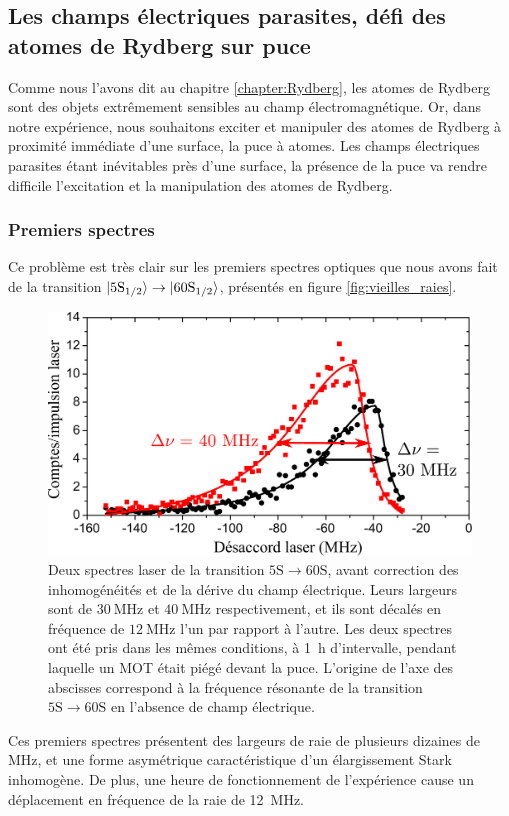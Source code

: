 %


		
	\subsection{Les champs électriques parasites, défi des atomes de Rydberg sur puce}\label{subsec:flashRb}
\noindent Comme nous l'avons dit au chapitre \ref{chapter:Rydberg}, les atomes de Rydberg sont des objets extrêmement sensibles au champ électromagnétique.
Or, dans notre expérience, nous souhaitons exciter et manipuler des atomes de Rydberg à proximité immédiate d'une surface, la puce à atomes.
Les champs électriques parasites étant inévitables près d'une surface, la présence de la puce va rendre difficile l'excitation et la manipulation des atomes de Rydberg.

\subsubsection*{Premiers spectres}
\noindent Ce problème est très clair sur les premiers spectres optiques que nous avons fait de la transition $\ket{\mathrm{5S_{1/2}}} \rightarrow \ket{\mathrm{60S_{1/2}}}$, présentés en figure \eqref{fig:vieilles_raies}.
%
\begin{figure}[!h]
\centering
\includegraphics[width=.8\linewidth]{figures/setup/rydberg/vieilles_raies}
\caption[Spectres d'excitation laser 5S-60S avant le dépôt de rubidium sur la puce]{
Deux spectres laser de la transition $5\mathrm{S}\rightarrow60\mathrm{S}$, avant correction des inhomogénéités et de la dérive du champ électrique.
Leurs largeurs sont de $\SI{30}{\MHz}$ et $\SI{40}{\MHz}$ respectivement, et ils sont décalés en fréquence de $\SI{12}{\MHz}$ l'un par rapport à l'autre.
Les deux spectres ont été pris dans les mêmes conditions, à \SI{1}{\hour} d'intervalle, pendant laquelle un MOT était piégé devant la puce.
L'origine de l'axe des abscisses correspond à la fréquence résonante de la transition $\mathrm{5S}\rightarrow\mathrm{60S}$ en l'absence de champ électrique.
}
\label{fig:vieilles_raies}
\end{figure}
%
Ces premiers spectres présentent des largeurs de raie de plusieurs dizaines de $\si{\MHz}$, et une forme asymétrique caractéristique d'un élargissement Stark inhomogène.
De plus, une heure de fonctionnement de l'expérience cause un déplacement en fréquence de la raie de \SI{12}{\MHz}.

